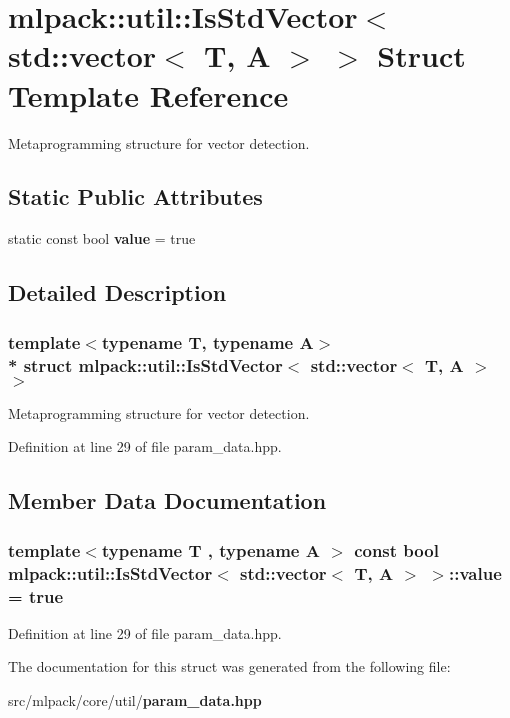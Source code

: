 \section{mlpack\+:\+:util\+:\+:Is\+Std\+Vector$<$ std\+:\+:vector$<$ T, A $>$ $>$ Struct Template Reference}
\label{structmlpack_1_1util_1_1IsStdVector_3_01std_1_1vector_3_01T_00_01A_01_4_01_4}


Metaprogramming structure for vector detection.  


\subsection*{Static Public Attributes}
\begin{DoxyCompactItemize}
\item 
static const bool {\bf value} = true
\end{DoxyCompactItemize}


\subsection{Detailed Description}
\subsubsection*{template$<$typename T, typename A$>$\\*
struct mlpack\+::util\+::\+Is\+Std\+Vector$<$ std\+::vector$<$ T, A $>$ $>$}

Metaprogramming structure for vector detection. 

Definition at line 29 of file param\+\_\+data.\+hpp.



\subsection{Member Data Documentation}
\subsubsection[{value}]{\setlength{\rightskip}{0pt plus 5cm}template$<$typename T , typename A $>$ const bool {\bf mlpack\+::util\+::\+Is\+Std\+Vector}$<$ std\+::vector$<$ T, A $>$ $>$\+::value = true\hspace{0.3cm}{\ttfamily [static]}}\label{structmlpack_1_1util_1_1IsStdVector_3_01std_1_1vector_3_01T_00_01A_01_4_01_4_af8f17110f4676192e57c9b59b14b204f}


Definition at line 29 of file param\+\_\+data.\+hpp.



The documentation for this struct was generated from the following file\+:\begin{DoxyCompactItemize}
\item 
src/mlpack/core/util/{\bf param\+\_\+data.\+hpp}\end{DoxyCompactItemize}
